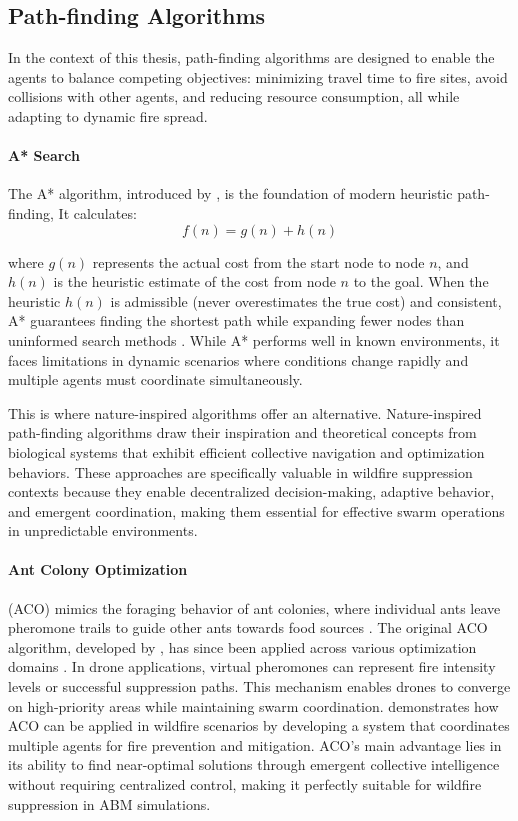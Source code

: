 \documentclass[11pt, a4paper]{article}
\begin{document}
\subsection{Path-finding Algorithms}

In the context of this thesis, path-finding algorithms are designed to enable the agents to balance competing objectives: minimizing travel time to fire sites, avoid collisions with other agents, and reducing resource consumption, all while adapting to dynamic fire spread.

\paragraph{A* Search} The A* algorithm, introduced by \citet*{heuristic}, is the foundation of modern heuristic path-finding, It calculates:
\begin{equation}
  f(n) = g(n) + h(n)
\end{equation}

where $g(n)$ represents the actual cost from the start node to node $n$, and $h(n)$ is the heuristic estimate of the cost from node $n$ to the goal. When the heuristic $h(n)$ is admissible (never overestimates the true cost) and consistent, A* guarantees finding the shortest path while expanding fewer nodes than uninformed search methods \citep{heuristic}. 
While A* performs well in known environments, it faces limitations in dynamic scenarios where conditions change rapidly and multiple agents must coordinate simultaneously.

This is where nature-inspired algorithms offer an alternative. Nature-inspired path-finding algorithms draw their inspiration and theoretical concepts from biological systems that exhibit efficient collective navigation and optimization behaviors. These approaches are specifically valuable in wildfire suppression contexts because they enable decentralized decision-making, adaptive behavior, and emergent coordination, making them essential for effective swarm operations in unpredictable environments.

\paragraph{Ant Colony Optimization} (ACO) mimics the foraging behavior of ant colonies, where individual ants leave pheromone trails to guide other ants towards food sources \citep{ACO}. The original ACO algorithm, developed by \citet*{ACO}, has since been applied across various optimization domains \citep{ACO_recent_advances}.
In drone applications, virtual pheromones can represent fire intensity levels or successful suppression paths. This mechanism enables drones to converge on high-priority areas while maintaining swarm coordination.
\citet*{HybridAntColonyWildfire} demonstrates how ACO can be applied in wildfire scenarios by developing a system that coordinates multiple agents for fire prevention and mitigation. ACO's main advantage lies in its ability to find near-optimal solutions through emergent collective intelligence without requiring centralized control, making it perfectly suitable for wildfire suppression in ABM simulations.
\end{document}
